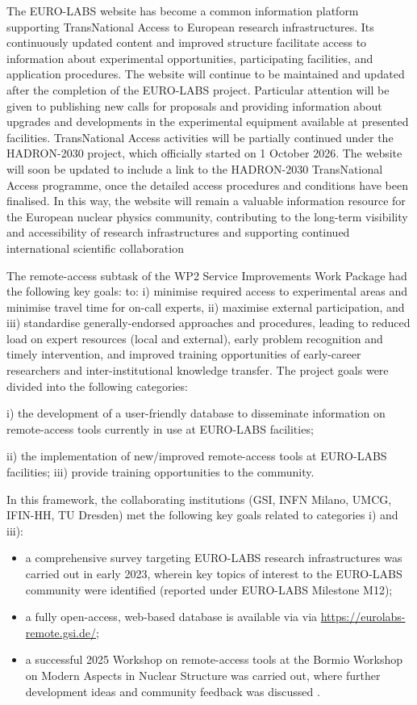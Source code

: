The EURO-LABS website has become a common information platform supporting TransNational Access to European research infrastructures. Its continuously updated content and improved structure facilitate access to information about experimental opportunities, participating facilities, and application procedures.
The website will continue to be maintained and updated after the completion of the EURO-LABS project. Particular attention will be given to publishing new calls for proposals and providing information about upgrades and developments in the experimental equipment available at presented facilities.
TransNational Access activities will be partially continued under the HADRON-2030 project, which officially started on 1 October 2026.
The website will soon be updated to include a link to the HADRON-2030 TransNational Access programme, once the detailed access procedures and conditions have been finalised.
In this way, the website will remain a valuable information resource for the European nuclear physics community, contributing to the long-term visibility and accessibility of research infrastructures and supporting continued international scientific collaboration


The remote-access subtask of the WP2 Service Improvements Work Package had the following key goals: to: i) minimise required access to experimental areas and minimise travel time for on-call experts, ii) maximise external participation, and iii) standardise generally-endorsed approaches and procedures, leading to reduced load on expert resources (local and external), early problem recognition and timely intervention, and improved training opportunities of early-career researchers and inter-institutional knowledge transfer. The project goals were divided into the following categories:

 i) the development of a user-friendly database to disseminate information on remote-access tools currently in use at EURO-LABS facilities;
 
ii) the implementation of new/improved remote-access tools at EURO-LABS facilities;
iii) provide training opportunities to the community.

In this framework, the collaborating institutions (GSI, INFN Milano, UMCG, IFIN-HH, TU Dresden) met the following key goals related to categories i) and iii):
\begin{itemize}
\item a comprehensive survey targeting EURO-LABS research infrastructures was carried out in early 2023, wherein key topics of interest to the EURO-LABS community were identified (reported under EURO-LABS Milestone M12);

\item a fully open-access, web-based database is available via via \url{https://eurolabs-remote.gsi.de/};

\item a successful 2025 Workshop on remote-access tools at the Bormio Workshop on Modern Aspects in Nuclear Structure was carried out, where further development ideas and community feedback was discussed .
\end{itemize}

